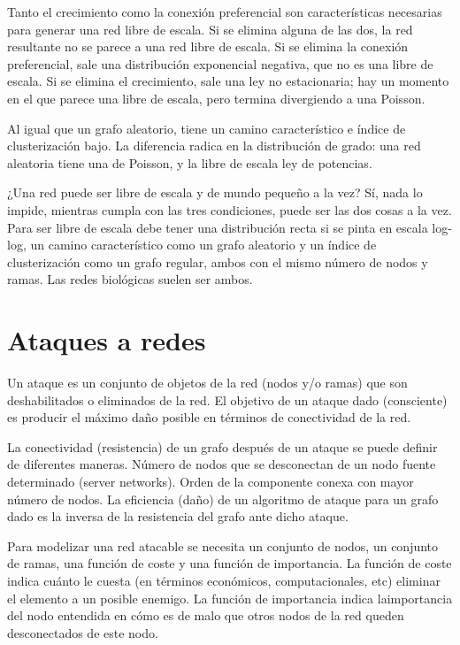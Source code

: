 Tanto el crecimiento como la conexión preferencial son características necesarias para generar una red libre de escala. Si se elimina alguna de las dos, la red resultante no se parece a una red libre de escala. Si se elimina la conexión preferencial, sale una distribución exponencial negativa, que no es una libre de escala. Si se elimina el crecimiento, sale una ley no estacionaria; hay un momento en el que parece una libre de escala, pero termina divergiendo a una Poisson.

Al igual que un grafo aleatorio, tiene un camino característico e índice de clusterización bajo. La diferencia radica en la distribución de grado: una red aleatoria tiene una de Poisson, y la libre de escala ley de potencias.

¿Una red puede ser libre de escala y de mundo pequeño a la vez? Sí, nada lo impide, mientras cumpla con las tres condiciones, puede ser las dos cosas a la vez. Para ser libre de escala debe tener una distribución recta si se pinta en escala log-log, un camino característico como un grafo aleatorio y un índice de clusterización como un grafo regular, ambos con el mismo número de nodos y ramas. Las redes biológicas suelen ser ambos.

\section{Ataques a redes}
Un ataque es un conjunto de objetos de la red (nodos y/o ramas) que son deshabilitados o eliminados de la red. El objetivo de un ataque dado (consciente) es producir el máximo daño posible en términos de conectividad de la red.

La conectividad (resistencia) de un grafo después de un ataque se puede definir de diferentes
maneras. Número de nodos que se desconectan de un nodo fuente determinado (server networks). Orden de la componente conexa con mayor número de nodos. La eficiencia (daño) de un algoritmo de ataque para un grafo dado es la inversa de la resistencia del grafo ante dicho ataque.

Para modelizar una red atacable se necesita un conjunto de nodos, un conjunto de ramas, una función de coste y una función de importancia. La función de coste indica cuánto le cuesta (en términos económicos,
computacionales, etc) eliminar el elemento a un posible enemigo. 
La función de importancia indica laimportancia del nodo entendida en cómo es de malo que otros nodos de la red queden desconectados de este nodo.

